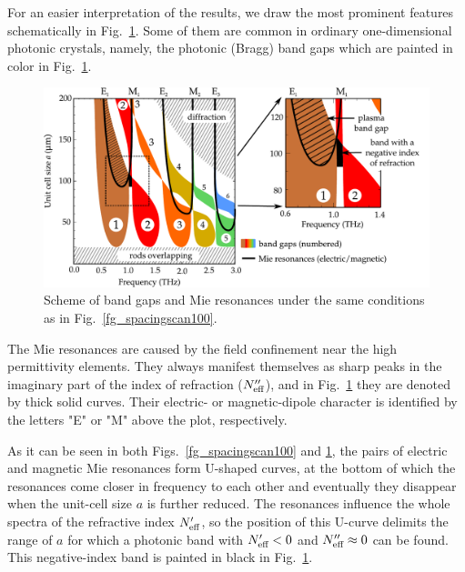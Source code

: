 \documentclass[letterpaper,12pt]{report}
\begin{document}
For an easier interpretation of the results, we draw the most prominent features
schematically in Fig.~\ref{fg_drawn100}. Some of them are common in ordinary
one-dimensional photonic crystals, namely, the photonic (Bragg) band gaps which are
painted in color in Fig.~\ref{fg_drawn100}.

\begin{figure}[h]
  \centering
    \includegraphics[width=14cm]{img/ERods_eps100_spacingscan_drawn_bands.pdf}
    \caption{Scheme of band gaps and Mie resonances under the same conditions as
    in Fig.~\ref{fg_spacingscan100}.}
\label{fg_drawn100}
\end{figure}

The Mie resonances are caused by the field confinement near the high permittivity
elements. They always manifest themselves as sharp peaks in the imaginary part of the
index of refraction ($N_{\text{eff} }''$), and in Fig.~\ref{fg_drawn100} they are denoted by thick
solid curves. Their electric- or magnetic-dipole character is identified by the letters
"E" or "M" above the plot, respectively.

As it can be seen in both Figs.~\ref{fg_spacingscan100} and \ref{fg_drawn100}, the pairs
of electric and magnetic Mie resonances form U-shaped curves, at the bottom of which the
resonances come closer in frequency to each other and eventually they disappear when the
unit-cell size $a$ is further reduced. The resonances influence the whole spectra of the
refractive index $N_{\text{eff} }'$, so the position of this U-curve delimits the range of $a$ for
which a photonic band with $N_{\text{eff} }' < 0$ and $N_{\text{eff} }'' \approx 0$ can be found. This
negative-index band is painted in black in Fig.~\ref{fg_drawn100}.
\end{document}
